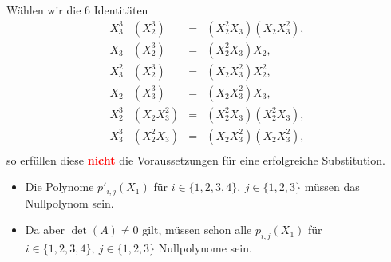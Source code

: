 \documentclass[11pt]{beamer}
\theoremstyle{custom}
\theoremstyle{custom}
\begin{document}
	\begin{frame}
			Wählen wir die $6$ Identitäten
			\begin{equation*}
				\begin{alignedat}{3}
					X_{3}^3&	\left( X_{2}^3\right)  &=& \left( X_{2}^2X_{3}\right) 	\left( X_{2}X_{3}^2\right), \\
					X_{3}&\left( X_{2}^3\right) &=&\left( X_{2}^2X_{3}\right) X_{2},\\
					X_{3}^2&	\left( X_{2}^3\right)  &=& \left(  X_{2}X_{3}^2\right) 	X_{2}^2,\\
					X_{2}&	\left( X_{3}^3\right)  &=& \left( X_{2}X_{3}^2\right) 	X_{3},\\
					X_{2}^3&	\left( X_{2}X_{3}^2\right)  &=& \left( X_{2}^2X_{3}\right)\left( X_{2}^2X_{3}\right),\\
					X_{3}^3&	\left( X_{2}^2X_{3}\right)  &=& \left( X_{2}X_{3}^2\right)\left( X_{2}X_{3}^2\right),\\
				\end{alignedat}
			\end{equation*}
			\pause
			so erfüllen diese \textbf{\textcolor{red}{nicht}} die Voraussetzungen für eine erfolgreiche Substitution.
	\end{frame}
	\begin{frame}
		\begin{itemize}
			\item Die Polynome
			$p'_{i,j}(X_{1})$ für $i \in \{1,2,3,4\}, \ j \in \{1,2,3\}$ müssen das Nullpolynom sein.
			\pause
			\item Da aber $\det(A) \neq 0$ gilt, müssen schon alle $p_{i,j}(X_{1})$ für $i \in \{1,2,3,4\}, \ j \in \{1,2,3\}$ Nullpolynome sein.
		\end{itemize}
	\end{frame}
\end{document}
